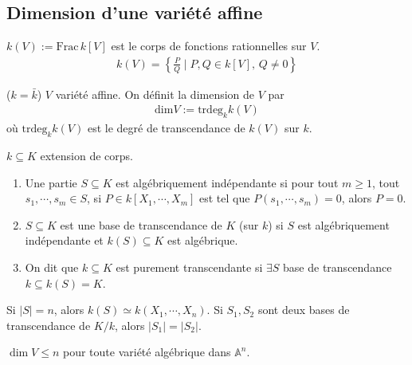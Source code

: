         \subsection{Dimension d'une variété affine}
            \begin{defi}
                $k(V) := \mathrm{Frac}\, k[V]$ est le corps de fonctions rationnelles sur $V$.
                \begin{align*}
                    k(V) = \left\{ \frac{P}{Q} \mid P,Q \in k[V],\, Q \neq 0 \right\}
                \end{align*}
            \end{defi}
            \begin{defi} ($k = \bar k$)
                $V$ variété affine. On définit la dimension de $V$ par
                \begin{align*}
                    \mathrm{dim} V := \mathrm{trdeg}_k k(V)
                \end{align*}
                où $\mathrm{trdeg}_k k(V)$ est le degré de transcendance de $k(V)$ sur $k$.
            \end{defi}
            \begin{defi}
                $k \subseteq K$ extension de corps.
                \begin{enumerate}
                    \item Une partie $S \subseteq K$ est algébriquement indépendante si pour tout $m \geq 1$, tout $s_1, \cdots, s_m \in S$, si $P \in k[X_1, \cdots, X_m]$ est tel que $P(s_1, \cdots, s_m) = 0$, alors $P = 0$.
                    \item $S \subseteq K$ est une base de transcendance de $K$ (sur $k$) si $S$ est algébriquement indépendante et $k(S) \subseteq K$ est algébrique.
                    \item On dit que $k \subseteq K$ est purement transcendante si $\exists S$ base de transcendance $k \subseteq k(S) = K$.
                \end{enumerate}
            \end{defi}
            \begin{remq}
                Si $|S| = n$, alors $k(S) \simeq k(X_1, \cdots, X_n)$. Si $S_1,S_2$ sont deux bases de transcendance de $K/k$, alors $|S_1| = |S_2|$. 
            \end{remq}
            \begin{remq}
                $\dim V \leq n$ pour toute variété algébrique dans $\mathbb{A}^n$.
            \end{remq}
